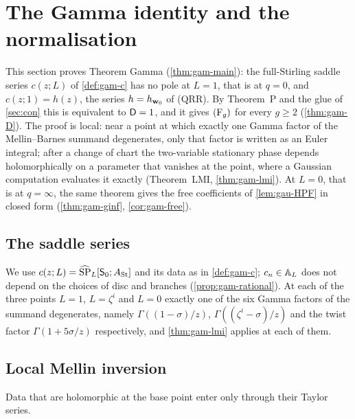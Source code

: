 
\section{The Gamma identity and the normalisation}
\label{sec:gam}

This section proves Theorem Gamma (\cref{thm:gam-main}): the full-Stirling saddle series $c(z;L)$ of \cref{def:gam-c} has no pole at $L=1$, that is at $q=0$, and $c(z;1)=h(z)$, the series $h=h_{\mathbf{w}_0}$ of (QRR). By Theorem~P and the glue of \cref{sec:con} this is equivalent to $\mathsf{D}=1$, and it gives $(\mathrm{F}_{g})$ for every $g\geq 2$ (\cref{thm:gam-D}). The proof is local: near a point at which exactly one Gamma factor of the Mellin--Barnes summand degenerates, only that factor is written as an Euler integral; after a change of chart the two-variable stationary phase depends holomorphically on a parameter that vanishes at the point, where a Gaussian computation evaluates it exactly (Theorem~LMI, \cref{thm:gam-lmi}). At $L=0$, that is at $q=\infty$, the same theorem gives the free coefficients of \cref{lem:gau-HPF} in closed form (\cref{thm:gam-ginf}, \cref{cor:gam-free}).

\subsection{The saddle series}
\label{sec:gam-series}

We use $c(z;L)=\widehat{\mathrm{SP}}_L[\mathsf S_0;A_{\mathrm{St}}]$ and its data as in \cref{def:gam-c}; $c_n\in\mathbb{A}_{L}$ does not depend on the choices of disc and branches (\cref{prop:gam-rational}). At each of the three points $L=1$, $L=\zeta^i$ and $L=0$ exactly one of the six Gamma factors of the summand degenerates, namely $\Gamma((1-\sigma)/z)$, $\Gamma((\zeta^i-\sigma)/z)$ and the twist factor $\Gamma(1+5\sigma/z)$ respectively, and \cref{thm:gam-lmi} applies at each of them.

\subsection{Local Mellin inversion}
\label{sec:gam-lmi}

Data that are holomorphic at the base point enter only through their Taylor series.

